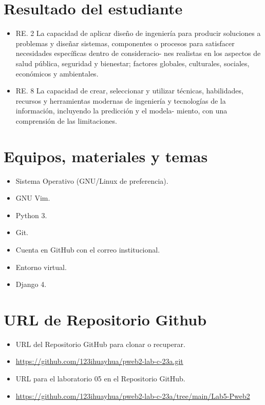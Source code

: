 \documentclass{article}
\begin{document}
    \section{Resultado del estudiante}
    \begin{itemize}
        \item RE. 2 La capacidad de aplicar diseño de ingeniería para producir soluciones a problemas y diseñar
            sistemas, componentes o procesos para satisfacer necesidades específicas dentro de consideracio-
            nes realistas en los aspectos de salud pública, seguridad y bienestar; factores globales, culturales,
            sociales, económicos y ambientales.
        \item RE. 8 La capacidad de crear, seleccionar y utilizar técnicas, habilidades, recursos y herramientas
            modernas de ingeniería y tecnologías de la información, incluyendo la predicción y el modela-
            miento, con una comprensión de las limitaciones.
    \end{itemize}
		
	\section{Equipos, materiales y temas}
	\begin{itemize}
		\item Sistema Operativo (GNU/Linux de preferencia).
		\item GNU Vim.
		\item Python 3.
		\item Git.
		\item Cuenta en GitHub con el correo institucional.
		\item Entorno virtual.
		\item Django 4.	
	\end{itemize}
	
	\section{URL de Repositorio Github}
	\begin{itemize}
		\item URL del Repositorio GitHub para clonar o recuperar.
		\item \url{https://github.com/123ihuayhua/pweb2-lab-c-23a.git}
		\item URL para el laboratorio 05 en el Repositorio GitHub.
		\item \url{https://github.com/123ihuayhua/pweb2-lab-c-23a/tree/main/Lab5-Pweb2}
	\end{itemize}
\end{document}
